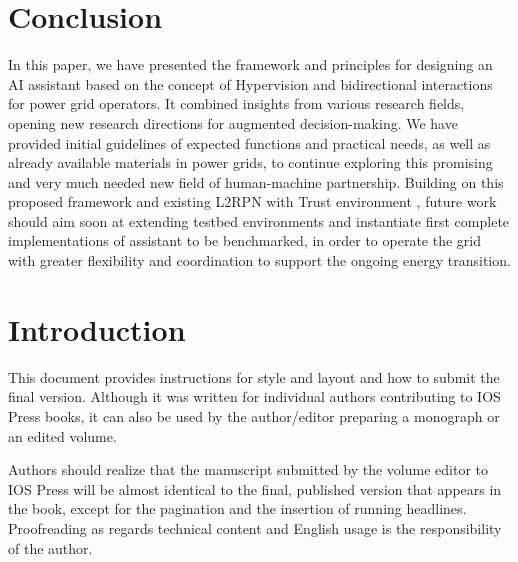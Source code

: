 \documentclass{IOS-Book-Article}
\begin{document}



\section{Conclusion}
In this paper, we have presented the framework and principles for designing an AI assistant based on the concept of Hypervision and bidirectional interactions for power grid operators. It combined insights from various research fields, opening new research directions for augmented decision-making. We have provided initial guidelines of expected functions and practical needs, as well as already available materials in power grids, to continue exploring this promising and very much needed new field of human-machine partnership. Building on this proposed framework and existing L2RPN with Trust environment \cite{l2rpn_with_trust}, future work should aim soon at extending testbed environments and instantiate first complete implementations of assistant to be benchmarked, in order to operate the grid with greater flexibility and coordination to support the ongoing energy transition.




\iffalse
\section{Introduction}
This document provides instructions for style and layout and how to submit the final
version. Although it was written for individual authors contributing to IOS Press books,
it can also be used by the author/editor preparing a monograph or an edited volume.

Authors should realize that the manuscript submitted by the volume editor to IOS
Press will be almost identical to the final, published version that appears in the book,
except for the pagination and the insertion of running headlines. Proofreading as
regards technical content and English usage is the responsibility of the author.
\end{document}

